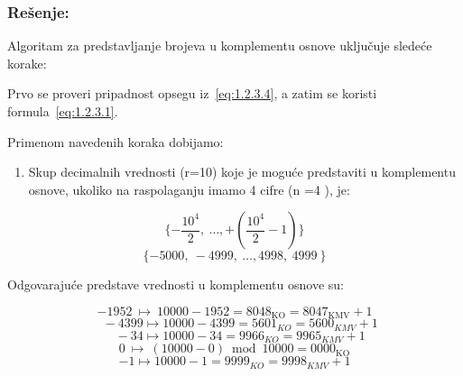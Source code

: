 \documentclass[a4paper,11pt]{article}
\numberwithin{equation}{section}
\begin{document}
\subsubsection*{Rešenje:}


Algoritam za predstavljanje brojeva u komplementu osnove uključuje sledeće korake:



Prvo se proveri pripadnost opsegu iz~\eqref{eq:1.2.3.4}, a zatim se koristi formula~\eqref{eq:1.2.3.1}.

Primenom navedenih koraka dobijamo:



\begin{enumerate}[label=\alph*),start=1,leftmargin=*]
\item Skup decimalnih vrednosti (r=10) koje je moguće predstaviti u komplementu osnove, ukoliko na raspolaganju imamo 4 cifre (n =4 ), je:

\end{enumerate}


\begin{equation}\label{eq:2.5.1}
\{ - \frac{10^{4}}{2},\ \ldots, + \left( \frac{10^{4}}{2} - 1 \right)\}
\end{equation}
\begin{equation}\label{eq:2.5.2}
\{ - 5000,\  - 4999,\ \ldots,4998,\ 4999\ \}
\end{equation}


Odgovarajuće predstave vrednosti u komplementu osnove su:



\begin{equation}\label{eq:2.5.3}
-1952\ \longmapsto\ 10000-1952=8048_{\mathrm{KO}}=8047_{\mathrm{KMV}}+1
\end{equation}
\begin{equation}\label{eq:2.5.4}
\ \ \ \  - 4399 \longmapsto 10000 - 4399 = 5601_{KO} = 5600_{KMV} + 1
\end{equation}
\begin{equation}\label{eq:2.5.5}
\ \ \ \  - 34 \longmapsto 10000 - 34 = 9966_{KO} = 9965_{KMV} + 1
\end{equation}
\begin{equation}\label{eq:2.5.6}
0\ \longmapsto\ (10000-0)\bmod10000=0000_{\mathrm{KO}}
\end{equation}
\begin{equation}\label{eq:2.5.7}
-1 \longmapsto 10000 - 1 = 9999_{KO} = 9998_{KMV} + 1
\end{equation}
\end{document}
